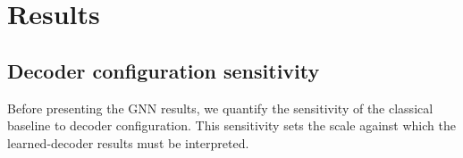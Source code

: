 \documentclass[a4paper,twocolumn,11pt,nopdfoutputerror]{quantumarticle}
\begin{document}
\section{Results}\label{sec:results}

\subsection{Decoder configuration sensitivity}\label{sec:baseline}

Before presenting the GNN results, we quantify the sensitivity of the
classical baseline to decoder configuration. This sensitivity sets the
scale against which the learned-decoder results must be interpreted.
\end{document}
